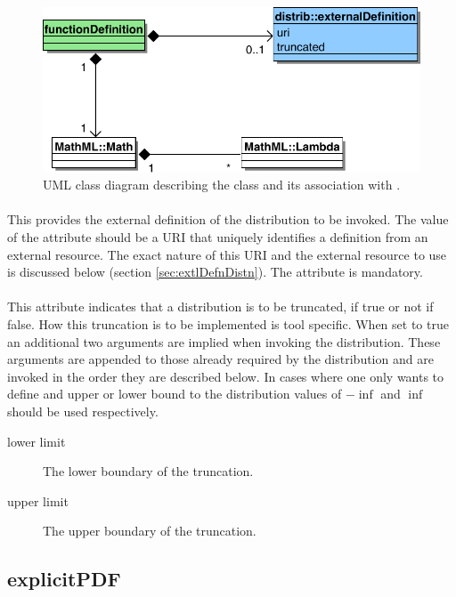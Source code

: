 \documentclass[draftspec]{sbmlpkgspec}
\begin{document}
\begin{figure}[htb]
\includegraphics[width=0.75\linewidth]{externalDefinitionUML}
\caption{UML class diagram describing the 
  class and its association with .}
\label{fig:externalDefinitionUml}
\end{figure}

\paragraph{}

This provides the external definition of the distribution to be
invoked. The value of the attribute should be a URI that
uniquely identifies a definition from an external resource. The exact
nature of this URI and the external resource to use is discussed below
(section \ref{sec:extlDefnDistn}). The attribute is mandatory.

\paragraph{}
\label{sec:truncatt}

This attribute indicates that a distribution is to be truncated, if
true or not if false. How this truncation is to be implemented is tool
specific. When set to true an additional two arguments are implied
when invoking the distribution. These arguments are appended to
those already required by the distribution and are invoked in the
order they are described below. In cases where one only wants to
define and upper or lower bound to the distribution values of
$-\inf$ and $\inf$ should be used respectively.

\begin{description}
\item[lower limit] The lower boundary of the truncation.
\item[upper limit] The upper boundary of the truncation.
\end{description}

\subsection{explicitPDF}
\end{document}
